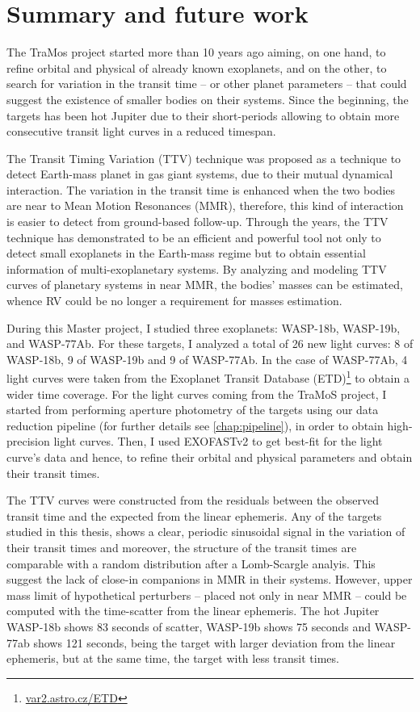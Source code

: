 \chapter{Summary and future work}\label{chap:conclusion}

The TraMos project started more than 10 years ago aiming, on one hand, to refine orbital and physical of already known exoplanets, and on the other, to search for variation in the transit time -- or other planet parameters -- that could suggest the existence of smaller bodies on their systems. Since the beginning, the targets has been hot Jupiter due to their short-periods allowing to obtain more consecutive transit light curves in a reduced timespan. 


The Transit Timing Variation (TTV) technique was proposed as a technique to detect Earth-mass planet in gas giant systems, due to their mutual dynamical interaction. The variation in the transit time is enhanced when the two bodies are near to Mean Motion Resonances (MMR), therefore, this kind of interaction is easier to detect from ground-based follow-up. Through the years, the TTV technique has demonstrated to be an efficient and powerful tool not only to detect small exoplanets in the Earth-mass regime but to obtain essential information of multi-exoplanetary systems. By analyzing and modeling TTV curves of planetary systems in near MMR, the bodies' masses can be estimated, whence RV could be no longer a requirement for masses estimation.

During this Master project, I studied three exoplanets: WASP-18b, WASP-19b, and WASP-77Ab. For these targets, I analyzed a total of 26 new light curves: 8 of WASP-18b, 9 of WASP-19b and 9 of WASP-77Ab. In the case of WASP-77Ab, 4 light curves were taken from the Exoplanet Transit Database (ETD)\footnote{\url{var2.astro.cz/ETD}} to obtain a wider time coverage. For the light curves coming from the TraMoS project, I started from performing aperture photometry of the targets using our data reduction pipeline (for further details see \ref{chap:pipeline}), in order to obtain high-precision light curves. Then, I used EXOFASTv2 \cite{Eastman2013,Eastman2017} to get best-fit for the light curve's data and hence, to refine their orbital and physical parameters and obtain their transit times.

The TTV curves were constructed from the residuals between the observed transit time and the expected from the linear ephemeris. Any of the targets studied in this thesis, shows a clear, periodic sinusoidal signal in the variation of their transit times and moreover, the structure of the transit times are comparable with a random distribution after a Lomb-Scargle analyis. This suggest the lack of close-in companions in MMR in their systems. However, upper mass limit of hypothetical perturbers -- placed not only in near MMR -- could be computed with the time-scatter from the linear ephemeris. The hot Jupiter WASP-18b shows 83 seconds of scatter, WASP-19b shows 75 seconds and WASP-77ab shows 121 seconds, being the target with larger deviation from the linear ephemeris, but at the same time, the target with less transit times.

